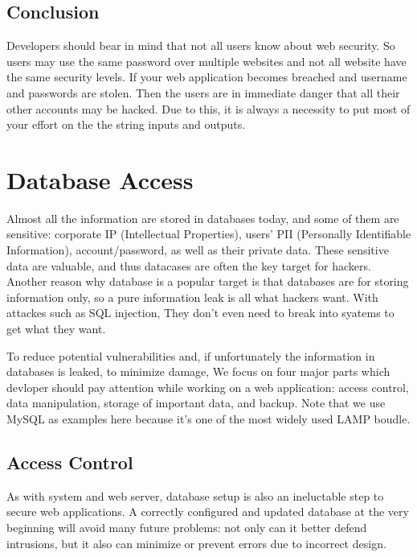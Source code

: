 \documentclass[conference]{IEEEtran}
\begin{document}
\subsection{Conclusion}
Developers should bear in mind that not all users know about web security. So users may use the same password over multiple websites and not all website have the same security levels. If your web application becomes breached and username and passwords are stolen. Then the users are in immediate danger that all their other accounts may be hacked. Due to this, it is always a necessity to put most of your effort on the the string inputs and outputs.

\section{Database Access}
Almost all the information are stored in databases today,
and some of them are sensitive:
corporate IP (Intellectual Properties),
users' PII (Personally Identifiable Information),
account/password, as well as their private data.
These sensitive data are valuable, and thus
datacases are often the key target for hackers.
Another reason why database is a popular target
is that databases are for storing information only,
so a pure information leak is all what hackers want.
With attackes such as SQL injection,
They don't even need to break into syatems to get what they want.

To reduce potential vulnerabilities
and, if unfortunately the information in databases is leaked,
to minimize damage,
We focus on four major parts which devloper should pay attention
while working on a web application:
access control, data manipulation, storage of important data,
and backup.
Note that we use MySQL as examples here because it's one of
the most widely used LAMP \cite{LAMP} boudle.

\subsection{Access Control}
As with system and web server, database setup is also an ineluctable
step to secure web applications.
A correctly configured and updated database at the very beginning will
avoid many future problems:
not only can it better defend intrusions,
but it also can minimize or prevent errors due to incorrect design.
\end{document}
